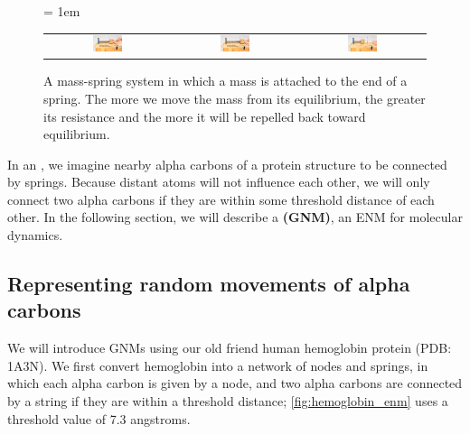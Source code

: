 \begin{figure}[h]
	\centering
	\tabcolsep = 1em
	\mySfFamily
	\begin{tabular}{c c c}
		\includegraphics[width = 0.25\textwidth]{../images/mass_spring1.png} & \includegraphics[width = 0.25\textwidth]{../images/mass_spring2.png} & \includegraphics[width = 0.25\textwidth]{../images/mass_spring3.png}
	\end{tabular}
	\caption{A mass-spring system in which a mass is attached to the end of a spring. The more we move the mass from its equilibrium, the greater its resistance and the more it will be repelled back toward equilibrium.}
	\label{fig:mass-spring}
\end{figure}


In an , we imagine nearby alpha carbons of a protein structure to be connected by springs. Because distant atoms will not influence each other, we will only connect two alpha carbons if they are within some threshold distance of each other. In the following section, we will describe a  \textbf{(GNM)}, an ENM for molecular dynamics.


\FloatBarrier
{}
\subsection{Representing random movements of alpha carbons}

We will introduce GNMs using our old friend human hemoglobin protein (PDB: 1A3N). We first convert hemoglobin into a network of nodes and springs, in which each alpha carbon is given by a node, and two alpha carbons are connected by a string if they are within a threshold distance; \autoref{fig:hemoglobin_enm} uses a threshold value of 7.3 angstroms.

